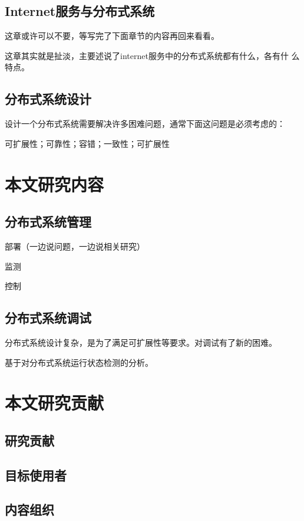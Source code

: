



\subsection{Internet服务与分布式系统}

这章或许可以不要，等写完了下面章节的内容再回来看看。

这章其实就是扯淡，主要述说了internet服务中的分布式系统都有什么，各有什
么特点。

\subsection{分布式系统设计}

设计一个分布式系统需要解决许多困难问题，通常下面这问题是必须考虑的：

可扩展性；可靠性；容错；一致性；可扩展性

\section{本文研究内容}

\subsection{分布式系统管理}

部署（一边说问题，一边说相关研究）

监测

控制


\subsection{分布式系统调试}

分布式系统设计复杂，是为了满足可扩展性等要求。对调试有了新的困难。

基于对分布式系统运行状态检测的分析。


\section{本文研究贡献}

\subsection{研究贡献}

\subsection{目标使用者}

\subsection{内容组织}

